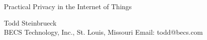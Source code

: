 \documentclass[final,11pt]{article}
\begin{document}
\thispagestyle{empty}
\setcounter{page}{0}

\begin{center}
{\Large
Practical Privacy in the Internet of Things
}

\vskip 0.2in
{\sc Todd Steinbrueck}
\\BECS Technology, Inc., St. Louis, Missouri
\vskip 0.05in
Email: todd@becs.com
\end{center}



\clearpage
\pagestyle{plain}
\setcounter{page}{1}










\clearpage


\end{document}
